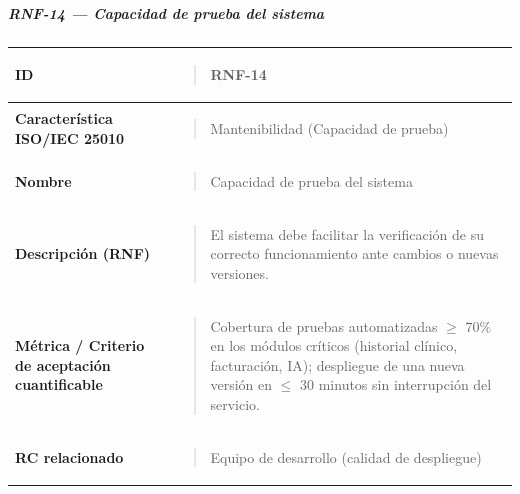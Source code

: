 \documentclass[
]{article}
\newcounter{none} %
\begin{document}
\subparagraph{RNF-14 --- Capacidad de prueba del
sistema}\label{rnf-14-capacidad-de-prueba-del-sistema}

{\def\LTcaptype{none} %
\begin{longtable}[]{@{}
  >{\raggedright\arraybackslash}p{}
  >{\raggedright\arraybackslash}p{}@{}}
\toprule\noalign{}
\begin{minipage}[b]{\linewidth}\raggedright
\textbf{ID}
\end{minipage} & \begin{minipage}[b]{\linewidth}\raggedright
\begin{quote}
RNF-14
\end{quote}
\end{minipage} \\
\midrule\noalign{}
\endhead
\bottomrule\noalign{}
\endlastfoot
\textbf{Característica ISO/IEC 25010} & \begin{minipage}[t]{\linewidth}\raggedright
\begin{quote}
Mantenibilidad (Capacidad de prueba)
\end{quote}
\end{minipage} \\
\textbf{Nombre} & \begin{minipage}[t]{\linewidth}\raggedright
\begin{quote}
Capacidad de prueba del sistema
\end{quote}
\end{minipage} \\
\textbf{Descripción (RNF)} & \begin{minipage}[t]{\linewidth}\raggedright
\begin{quote}
El sistema debe facilitar la verificación de su correcto funcionamiento
ante cambios o nuevas versiones.
\end{quote}
\end{minipage} \\
\textbf{Métrica / Criterio de aceptación cuantificable} & \begin{minipage}[t]{\linewidth}\raggedright
\begin{quote}
Cobertura de pruebas automatizadas \(\geq\) 70\% en los módulos
críticos (historial clínico, facturación, IA); despliegue de una nueva
versión en \(\leq\) 30 minutos sin interrupción del servicio.
\end{quote}
\end{minipage} \\
\textbf{RC relacionado} & \begin{minipage}[t]{\linewidth}\raggedright
\begin{quote}
Equipo de desarrollo (calidad de despliegue)
\end{quote}
\end{minipage} \\
\end{longtable}
}
\end{document}
